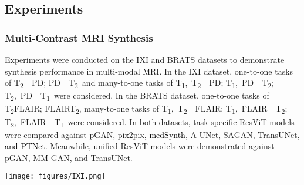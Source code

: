 \documentclass[journal,twoside,web]{ieeecolor}
\newcommand{\TtwoPD}{T\textsubscript{2}~~PD}
\newcommand{\PDTtwo}{PD~~T\textsubscript{2}}
\newcommand{\TtwoPDTone}{T\textsubscript{2},~PD~~T\textsubscript{1}}
\newcommand{\TonePDTtwo}{T\textsubscript{1},~PD~~T\textsubscript{2}}
\newcommand{\ToneTtwoPD}{T\textsubscript{1},~T\textsubscript{2}~~PD}
\newcommand{\TtwoFlair}{T\textsubscript{2}FLAIR}
\newcommand{\FlairTtwo}{FLAIRT\textsubscript{2}}
\newcommand{\TtwoFlairTone}{T\textsubscript{2},~FLAIR~~T\textsubscript{1}}
\newcommand{\ToneFlairTtwo}{T\textsubscript{1},~FLAIR~~T\textsubscript{2}}
\newcommand{\ToneTtwoFlair}{T\textsubscript{1},~T\textsubscript{2}~~FLAIR}
\newcommand*{\revhl}{\textcolor{black}}
\begin{document}
\vspace{-1.25ex}
\subsection{Experiments}



\subsubsection{Multi-Contrast MRI Synthesis} Experiments were conducted on the IXI and BRATS datasets to demonstrate synthesis performance in multi-modal MRI. In the IXI dataset, one-to-one tasks of \TtwoPD; \PDTtwo~and many-to-one tasks of \ToneTtwoPD; \TonePDTtwo; \TtwoPDTone~were considered. In the BRATS dataset, one-to-one tasks of \TtwoFlair; \FlairTtwo, many-to-one tasks of \ToneTtwoFlair; \ToneFlairTtwo; \TtwoFlairTone~were considered. In both datasets, task-specific ResViT models were compared against pGAN, pix2pix, \revhl{medSynth}, A-UNet, SAGAN, TransUNet, \revhl{and PTNet}. Meanwhile, unified ResViT models were demonstrated against pGAN, MM-GAN, and TransUNet. 

\begin{figure*}[t]
\vspace{-0.5mm}
\centering
\texttt{[image: figures/IXI.png]}
\captionsetup{justification=justified,singlelinecheck=false}
\caption{\revhl{ResViT was demonstrated on the IXI dataset for two representative many-to-one synthesis tasks: a) \ToneTtwoPD, b) \TtwoPDTone. Synthesized images from all competing methods are shown along with the source images and the reference target image. ResViT improves synthesis performance in regions that are depicted sub-optimally in competing methods. Overall, ResViT generates images with lower artifact and noise levels and sharper tissue depiction.}}
\label{fig:IXI}
\vspace{-4mm}
\end{figure*}
\end{document}
